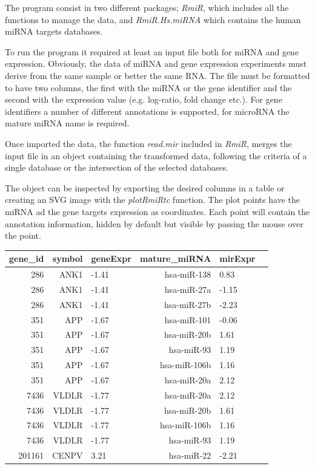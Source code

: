 \documentclass{bioinfo}
\begin{document}
\begin{application}
The program consist in two different packages; \textit{RmiR}, which includes all the functions to manage the data, and \textit{RmiR.Hs.miRNA} which contains the human miRNA targets databases.
\par To run the program it required at least an input file both for miRNA and gene expression. Obviously, the data of miRNA and gene expression experiments must derive from the same sample or better the same RNA. The file must be formatted to have two columns, the first with the miRNA or the gene identifier and the second with the expression value (e.g. log-ratio, fold change etc.). For gene identifiers a number of different annotations is supported, for microRNA the mature miRNA name is required. 
\par Once imported the data, the function \textit{read.mir} included in \textit{RmiR}, merges the input file in an object containing the transformed data, following the criteria of a single database or the intersection of the selected databases.
\par The object can be inspected by exporting the desired columns in a table or creating an SVG image with the \textit{plotRmiRtc} function. The plot points have the miRNA ad the gene targets expression as coordinates. Each point will contain the annotation information, hidden by default but visible by passing the mouse over the point.

\begin{table}[ht]
\begin{center}
\begin{tabular}{rrlrlr}
  \hline
gene\_id & symbol & geneExpr & mature\_miRNA & mirExpr \\ 
  \hline
286 & ANK1 & -1.41 & hsa-miR-138 & 0.83 \\ 
286 & ANK1 & -1.41 & hsa-miR-27a & -1.15 \\ 
286 & ANK1 & -1.41 & hsa-miR-27b & -2.23 \\ 
351 & APP & -1.67 & hsa-miR-101 & -0.06 \\ 
351 & APP & -1.67 & hsa-miR-20b & 1.61 \\ 
351 & APP & -1.67 & hsa-miR-93 & 1.19 \\ 
351 & APP & -1.67 & hsa-miR-106b & 1.16 \\ 
351 & APP & -1.67 & hsa-miR-20a & 2.12 \\ 
7436 & VLDLR & -1.77 & hsa-miR-20a & 2.12 \\ 
7436 & VLDLR & -1.77 & hsa-miR-20b & 1.61 \\ 
7436 & VLDLR & -1.77 & hsa-miR-106b & 1.16 \\ 
7436 & VLDLR & -1.77 & hsa-miR-93 & 1.19 \\ 
201161 & CENPV & 3.21 & hsa-miR-22 & -2.21 \\ 
   \hline
\end{tabular}
\end{center}
\end{table}


\end{application}
\end{document}
